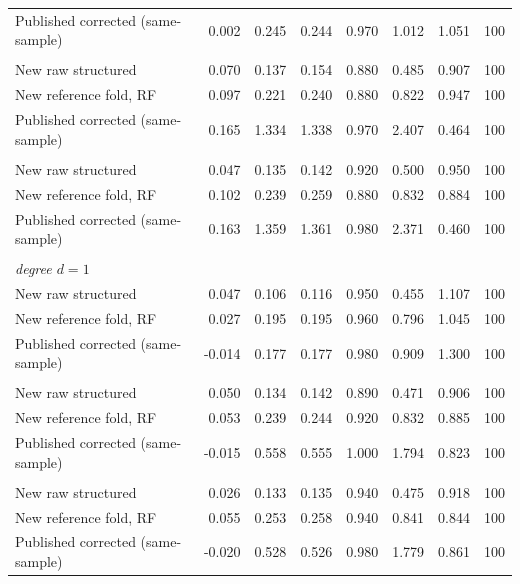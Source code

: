 {\begin{longtable}{lrrrrrrr}
\quad Published corrected (same-sample) & 0.002 & 0.245 & 0.244 & 0.970 & 1.012 & 1.051 & 100 \\
\addlinespace
\multicolumn{8}{l}{\textit{degree $d=2$}} \\
\quad New raw structured & 0.070 & 0.137 & 0.154 & 0.880 & 0.485 & 0.907 & 100 \\
\quad New reference fold, RF & 0.097 & 0.221 & 0.240 & 0.880 & 0.822 & 0.947 & 100 \\
\quad Published corrected (same-sample) & 0.165 & 1.334 & 1.338 & 0.970 & 2.407 & 0.464 & 100 \\
\addlinespace
\multicolumn{8}{l}{\textit{degree $d=3$}} \\
\quad New raw structured & 0.047 & 0.135 & 0.142 & 0.920 & 0.500 & 0.950 & 100 \\
\quad New reference fold, RF & 0.102 & 0.239 & 0.259 & 0.880 & 0.832 & 0.884 & 100 \\
\quad Published corrected (same-sample) & 0.163 & 1.359 & 1.361 & 0.980 & 2.371 & 0.460 & 100 \\
\addlinespace
\multicolumn{8}{l}{\textit{selection\_both}} \\
\multicolumn{8}{l}{\textit{degree $d=1$}} \\
\quad New raw structured & 0.047 & 0.106 & 0.116 & 0.950 & 0.455 & 1.107 & 100 \\
\quad New reference fold, RF & 0.027 & 0.195 & 0.195 & 0.960 & 0.796 & 1.045 & 100 \\
\quad Published corrected (same-sample) & -0.014 & 0.177 & 0.177 & 0.980 & 0.909 & 1.300 & 100 \\
\addlinespace
\multicolumn{8}{l}{\textit{degree $d=2$}} \\
\quad New raw structured & 0.050 & 0.134 & 0.142 & 0.890 & 0.471 & 0.906 & 100 \\
\quad New reference fold, RF & 0.053 & 0.239 & 0.244 & 0.920 & 0.832 & 0.885 & 100 \\
\quad Published corrected (same-sample) & -0.015 & 0.558 & 0.555 & 1.000 & 1.794 & 0.823 & 100 \\
\addlinespace
\multicolumn{8}{l}{\textit{degree $d=3$}} \\
\quad New raw structured & 0.026 & 0.133 & 0.135 & 0.940 & 0.475 & 0.918 & 100 \\
\quad New reference fold, RF & 0.055 & 0.253 & 0.258 & 0.940 & 0.841 & 0.844 & 100 \\
\quad Published corrected (same-sample) & -0.020 & 0.528 & 0.526 & 0.980 & 1.779 & 0.861 & 100 \\

\end{longtable}}
